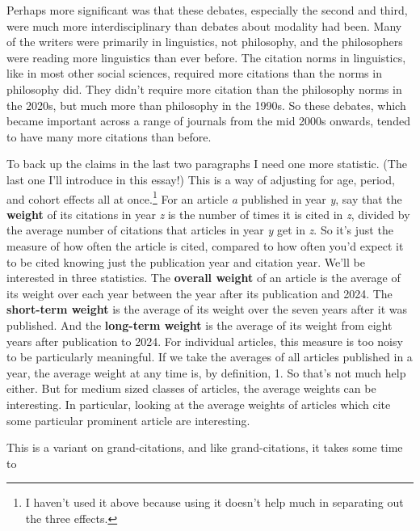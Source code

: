 \documentclass[
  12pt,
  letterpaper,
  DIV=11,
  numbers=noendperiod]{scrartcl}
\begin{document}
Perhaps more significant was that these debates, especially the second
and third, were much more interdisciplinary than debates about modality
had been. Many of the writers were primarily in linguistics, not
philosophy, and the philosophers were reading more linguistics than ever
before. The citation norms in linguistics, like in most other social
sciences, required more citations than the norms in philosophy did. They
didn't require more citation than the philosophy norms in the 2020s, but
much more than philosophy in the 1990s. So these debates, which became
important across a range of journals from the mid 2000s onwards, tended
to have many more citations than before.

To back up the claims in the last two paragraphs I need one more
statistic. (The last one I'll introduce in this essay!) This is a way of
adjusting for age, period, and cohort effects all at once.\footnote{I
  haven't used it above because using it doesn't help much in separating
  out the three effects.} For an article \emph{a} published in year
\emph{y}, say that the \textbf{weight} of its citations in year \emph{z}
is the number of times it is cited in \emph{z}, divided by the average
number of citations that articles in year \emph{y} get in \emph{z}. So
it's just the measure of how often the article is cited, compared to how
often you'd expect it to be cited knowing just the publication year and
citation year. We'll be interested in three statistics. The
\textbf{overall weight} of an article is the average of its weight over
each year between the year after its publication and 2024. The
\textbf{short-term weight} is the average of its weight over the seven
years after it was published. And the \textbf{long-term weight} is the
average of its weight from eight years after publication to 2024. For
individual articles, this measure is too noisy to be particularly
meaningful. If we take the averages of all articles published in a year,
the average weight at any time is, by definition, 1. So that's not much
help either. But for medium sized classes of articles, the average
weights can be interesting. In particular, looking at the average
weights of articles which cite some particular prominent article are
interesting.

This is a variant on grand-citations, and like grand-citations, it takes
some time to
\end{document}
